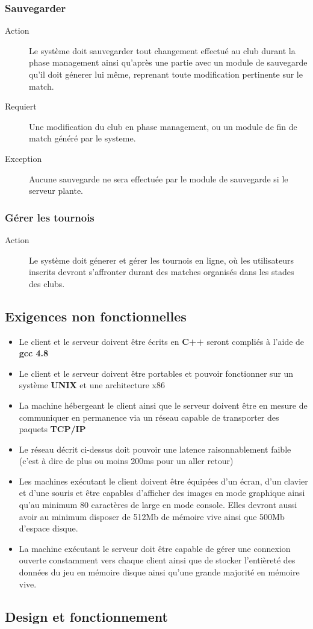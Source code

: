 \documentclass[a4paper]{article}
\begin{document}
\subsubsection{Sauvegarder}
\begin{description}
\item[Action] Le système doit sauvegarder tout changement effectué au \gls{club} durant la phase management ainsi qu'après une partie avec un module de sauvegarde qu'il doit génerer lui même, reprenant toute modification pertinente sur le match.
\item[Requiert] Une modification du club en phase management, ou un module de fin de match généré par le systeme. 
\item[Exception] Aucune sauvegarde ne sera effectuée par le module de sauvegarde si le \gls{serveur} plante.
\end{description}

\subsubsection{Gérer les tournois}
\begin{description}
\item[Action] Le système doit génerer et gérer les tournois en ligne, où les \glspl{utilisateur} inscrits devront s'affronter durant des matches organisés dans les stades des clubs.
\end{description}


\subsection{Exigences non fonctionnelles}
\label{enf}
\begin{itemize}
\item Le client et le \gls{serveur} doivent être écrits en \textbf{C++} seront compliés à l'aide de \textbf{gcc 4.8}
\item Le client et le \gls{serveur} doivent être portables et pouvoir fonctionner sur un système \textbf{UNIX} et une architecture x86
\item La machine hébergeant le client ainsi que le \gls{serveur} doivent être en mesure de communiquer en permanence via un réseau capable de transporter des paquets \textbf{TCP/IP}
\item Le réseau décrit ci-dessus doit pouvoir une latence raisonnablement faible (c'est à dire de plus ou moins 200ms pour un aller retour)
\item Les machines exécutant le client doivent être équipées d'un écran, d'un clavier et d'une souris et être capables d'afficher des images en mode graphique ainsi qu'au minimum 80 caractères de large en mode console. Elles devront aussi avoir au minimum disposer de 512Mb de mémoire vive ainsi que 500Mb d'espace disque.
\item La machine exécutant le \gls{serveur} doit être capable de gérer une connexion ouverte constamment vers chaque client ainsi que de stocker l'entièreté des données du jeu en mémoire disque ainsi qu'une grande majorité en mémoire vive.
\end{itemize}

\subsection{Design et fonctionnement}

\printindex
\tableofcontents
\listoffigures
\end{document}
